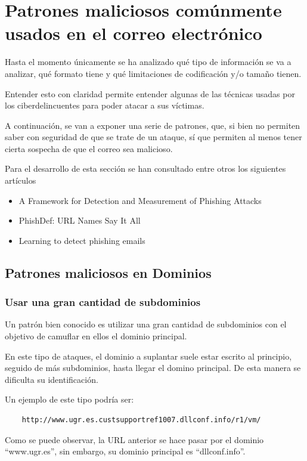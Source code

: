 \section{Patrones maliciosos comúnmente usados en el correo electrónico}
Hasta el momento únicamente se ha analizado qué tipo de información se va a analizar, qué formato tiene y qué limitaciones de codificación y/o tamaño tienen. 

Entender esto con claridad permite entender algunas de las técnicas usadas por los ciberdelincuentes para poder atacar a sus víctimas. 

A continuación, se van a exponer una serie de patrones, que, si bien no permiten saber con seguridad de que se trate de un ataque, sí que permiten al menos tener cierta sospecha de que el correo sea malicioso.

Para el desarrollo de esta sección se han consultado entre otros los siguientes artículos 

\begin{itemize}
    \item A Framework for Detection and Measurement of Phishing Attacks \cite{phishing1}
    \item PhishDef: URL Names Say It All \cite{phishing2}
    \item Learning to detect phishing emails \cite{phishing3}
\end{itemize}

\subsection{Patrones maliciosos en Dominios}
\subsubsection{Usar una gran cantidad de subdominios}
Un patrón bien conocido es utilizar una gran cantidad de subdominios con el objetivo de camuflar en ellos el dominio principal. 

En este tipo de ataques, el dominio a suplantar suele estar escrito al principio, seguido de más subdominios, hasta llegar el domino principal. De esta manera se dificulta su identificación. 

Un ejemplo de este tipo podría ser: 

\begin{verbatim}
    http://www.ugr.es.custsupportref1007.dllconf.info/r1/vm/
\end{verbatim}

Como se puede observar, la URL anterior se hace pasar por el dominio “www.ugr.es”, sin embargo, su dominio principal es “dllconf.info”.

